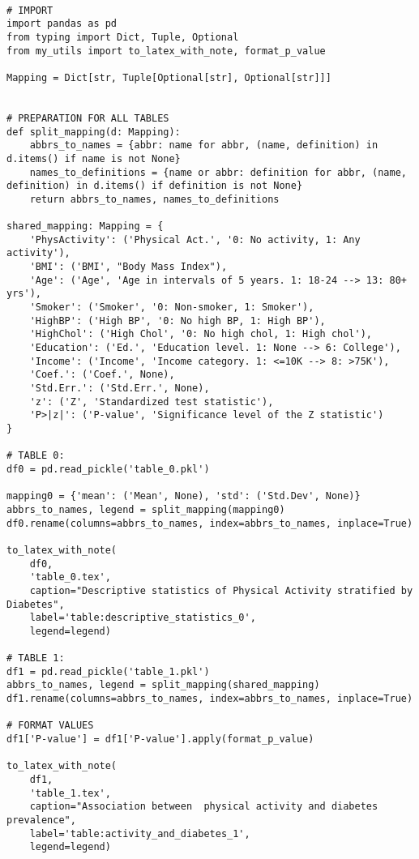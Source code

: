 \documentclass[11pt]{article}
\begin{document}
\begin{verbatim}

# IMPORT
import pandas as pd
from typing import Dict, Tuple, Optional
from my_utils import to_latex_with_note, format_p_value

Mapping = Dict[str, Tuple[Optional[str], Optional[str]]]


# PREPARATION FOR ALL TABLES
def split_mapping(d: Mapping):
    abbrs_to_names = {abbr: name for abbr, (name, definition) in d.items() if name is not None}
    names_to_definitions = {name or abbr: definition for abbr, (name, definition) in d.items() if definition is not None}
    return abbrs_to_names, names_to_definitions

shared_mapping: Mapping = {
    'PhysActivity': ('Physical Act.', '0: No activity, 1: Any activity'),
    'BMI': ('BMI', "Body Mass Index"),
    'Age': ('Age', 'Age in intervals of 5 years. 1: 18-24 --> 13: 80+ yrs'),
    'Smoker': ('Smoker', '0: Non-smoker, 1: Smoker'),
    'HighBP': ('High BP', '0: No high BP, 1: High BP'),
    'HighChol': ('High Chol', '0: No high chol, 1: High chol'),
    'Education': ('Ed.', 'Education level. 1: None --> 6: College'),
    'Income': ('Income', 'Income category. 1: <=10K --> 8: >75K'),
    'Coef.': ('Coef.', None),
    'Std.Err.': ('Std.Err.', None),
    'z': ('Z', 'Standardized test statistic'),
    'P>|z|': ('P-value', 'Significance level of the Z statistic')
}

# TABLE 0:
df0 = pd.read_pickle('table_0.pkl')

mapping0 = {'mean': ('Mean', None), 'std': ('Std.Dev', None)}
abbrs_to_names, legend = split_mapping(mapping0)
df0.rename(columns=abbrs_to_names, index=abbrs_to_names, inplace=True)

to_latex_with_note(
    df0, 
    'table_0.tex', 
    caption="Descriptive statistics of Physical Activity stratified by Diabetes", 
    label='table:descriptive_statistics_0',
    legend=legend)

# TABLE 1:
df1 = pd.read_pickle('table_1.pkl')
abbrs_to_names, legend = split_mapping(shared_mapping)
df1.rename(columns=abbrs_to_names, index=abbrs_to_names, inplace=True)

# FORMAT VALUES
df1['P-value'] = df1['P-value'].apply(format_p_value)

to_latex_with_note(
    df1, 
    'table_1.tex',
    caption="Association between  physical activity and diabetes prevalence",
    label='table:activity_and_diabetes_1',
    legend=legend)


\end{verbatim}
\end{document}
